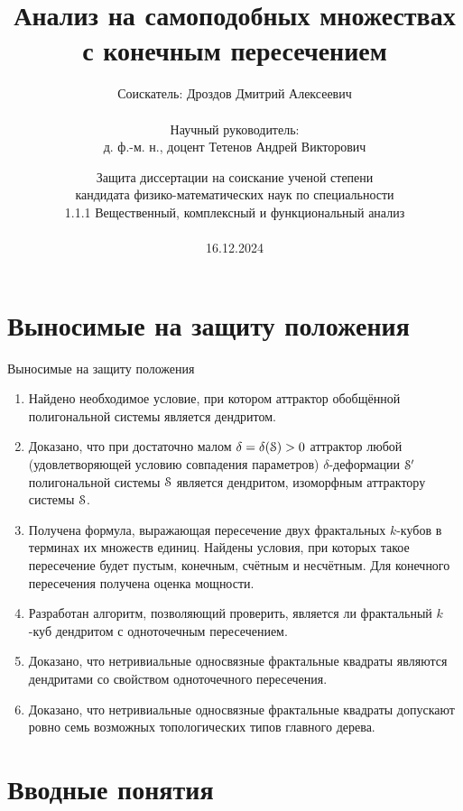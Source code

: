 \documentclass[aspectratio=1610, 10pt, notheorems]{beamer}
\title[ ]
    {Анализ на самоподобных множествах с конечным пересечением}
\author[ ]
    {Соискатель: Дроздов Дмитрий Алексеевич\\ \; \\
    Научный руководитель:\\ 
    д. ф.-м. н., доцент Тетенов Андрей Викторович}
\institute[ИМ СО РАН]{Институт математики имени С. Л. Соболева СО РАН, Новосибирск}
\date[10.06.2024]
    {Защита диссертации на соискание ученой степени\\ кандидата физико-математических наук по специальности \\1.1.1 Вещественный, комплексный и функциональный анализ\\ \; \\
    16.12.2024}
\begin{document}
\begin{frame}{}
    \titlepage
\end{frame}


\section{Выносимые на защиту положения} 

\begin{frame}{Выносимые на защиту положения}

{\normalsize
\begin{enumerate}
\item Найдено необходимое условие, при котором аттрактор обобщённой полигональной системы является дендритом.
\item Доказано, что при достаточно малом $\delta=\delta({\EuScript S})>0$ аттрактор любой (удовлетворяющей условию совпадения параметров) $\delta$-деформации ${\EuScript S}'$ полигональной системы ${\EuScript S}$ является дендритом, изоморфным аттрактору системы ${\EuScript S}$.
\item Получена формула, выражающая пересечение двух фрактальных $k$-кубов в терминах их множеств единиц.
Найдены условия, при которых такое пересечение будет пустым, конечным, счётным и несчётным.
Для конечного пересечения получена оценка мощности.
\item Разработан алгоритм, позволяющий проверить, является ли фрактальный $k$-куб дендритом с одноточечным пересечением.
\item Доказано, что нетривиальные односвязные фрактальные квадраты являются дендритами со свойством одноточечного пересечения.
\item Доказано, что нетривиальные односвязные фрактальные квадраты допускают ровно семь возможных топологических типов главного дерева.
\end{enumerate}}
\end{frame}


\section{Вводные понятия} %
\end{document}
